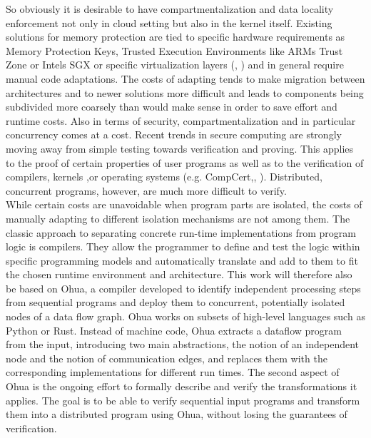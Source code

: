 So obviously it is desirable to have compartmentalization and data locality enforcement not only in cloud setting but also in the kernel itself. Existing solutions for memory protection are tied to specific hardware requirements as Memory Protection Keys, Trusted Execution Environments like ARMs Trust Zone\cite{pinto2019demystifying} or Intels SGX \cite{costan2016intel} or specific virtualization layers (\cite{tan2007ikernel}, \cite{nikolaev2013virtuos}) and in general require manual code adaptations. The costs of adapting tends to make migration between architectures and to newer solutions more difficult and leads to components being subdivided more coarsely than would make sense in order to save effort and runtime costs. Also in terms of security, compartmentalization and in particular concurrency comes at a cost. Recent trends in secure computing are strongly moving away from simple testing towards verification and proving. This applies to the proof of certain properties of user programs as well as to the verification of compilers, kernels ,or operating systems (e.g. CompCert\cite{leroy2009formal},\cite{sL4Verf}, \cite{gu2016certikos}). Distributed, concurrent programs, however, are much more difficult to verify. \\

While certain costs are unavoidable when program parts are isolated, the costs of manually adapting to different isolation mechanisms are not among them. The classic approach to separating concrete run-time implementations from program logic is compilers. They allow the programmer to define and test the logic within specific programming models and automatically translate and add to them to fit the chosen runtime environment and architecture.
This work will therefore also be based on Ohua\cite{ertel2015ohua}, a compiler developed to identify independent processing steps from sequential programs and deploy them to concurrent, potentially isolated nodes of a data flow graph. Ohua works on subsets of high-level languages such as Python or Rust. Instead of machine code, Ohua extracts a dataflow program from the input, introducing two main abstractions, the notion of an independent node and the notion of communication edges, and replaces them with the corresponding implementations for different run times. The second aspect of Ohua is the ongoing effort to formally describe and verify the transformations it applies. The goal is to be able to verify sequential input programs and transform them into a distributed program using Ohua, without losing the guarantees of verification. 

